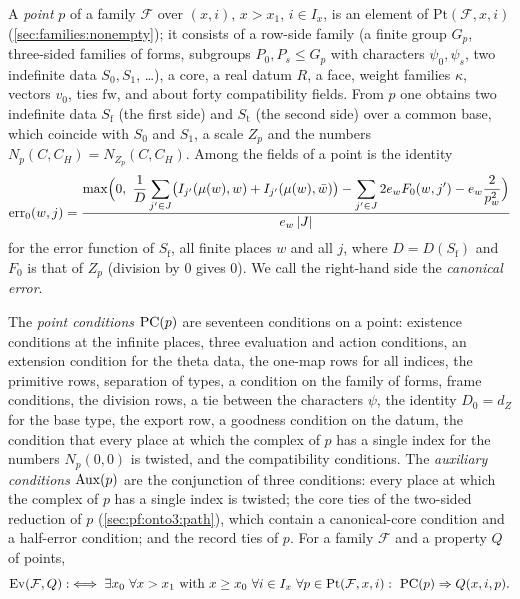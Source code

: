 A \emph{point} $p$ of a family $\mathcal F$ over $(x,i)$, $x>x_1$, $i\in I_x$, is an element of
$\mathrm{Pt}(\mathcal F,x,i)$ (\cref{sec:families:nonempty}); it consists of a row-side family (a finite group
$G_p$, three-sided families of forms, subgroups $P_0,P_s\le G_p$ with characters $\psi_0,\psi_s$, two indefinite
data $S_0,S_1$, \dots), a core, a real datum $R$, a face, weight families $\kappa$, vectors $v_0$, ties
$\mathrm{fw}$, and about forty compatibility fields. From $p$ one obtains two indefinite data $S_{\mathrm f}$ (the
first side) and $S_{\mathrm t}$ (the second side) over a common base, which coincide with $S_0$ and $S_1$, a scale
$Z_p$ and the numbers $N_p(C,C_H)=N_{Z_p}(C,C_H)$. Among the fields of a point is the identity
\begin{equation}\label{eq:pf:onto3:erreq}
\ontothreeerr_0(w,j)=\frac{\max\Bigl(0,\ \dfrac{1}{D}\displaystyle\sum_{j'\in J}\bigl(I_{j'}(\mu(w),w)+
I_{j'}(\mu(w),\bar w)\bigr)-\sum_{j'\in J}2e_wF_0(w,j')-e_w\frac{2}{p_w^2}\Bigr)}{e_w\,|J|}
\end{equation}
for the error function of $S_{\mathrm f}$, all finite places $w$ and all $j$, where $D=D(S_{\mathrm f})$ and
$F_0$ is that of $Z_p$ (division by $0$ gives $0$). We call the right-hand side the \emph{canonical error}.

The \emph{point conditions} $\mathrm{PC}(p)$ are seventeen conditions on a point: existence conditions at the
infinite places, three evaluation and action conditions, an extension condition for the theta data, the one-map
rows for all indices, the primitive rows, separation of types, a condition on the family of forms, frame
conditions, the division rows, a tie between the characters $\psi$, the identity $D_0=d_Z$ for the base type, the
export row, a goodness condition on the datum, the condition that every place at which the complex of $p$ has a
single index for the numbers $N_p(0,0)$ is twisted, and the compatibility conditions. The \emph{auxiliary
conditions} $\mathrm{Aux}(p)$ are the conjunction of three conditions: every place at which the complex of $p$ has
a single index is twisted; the core ties of the two-sided reduction of $p$ (\cref{sec:pf:onto3:path}), which
contain a canonical-core condition and a half-error condition; and the record ties of $p$. For a family
$\mathcal F$ and a property $Q$ of points,
\[
\mathrm{Ev}(\mathcal F,Q):\iff\exists x_0\ \forall x>x_1\text{ with }x\ge x_0\ \forall i\in I_x\
\forall p\in\mathrm{Pt}(\mathcal F,x,i):\ \mathrm{PC}(p)\Rightarrow Q(x,i,p).
\]

